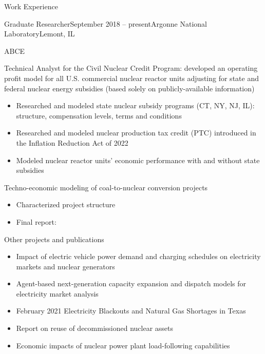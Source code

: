 \documentclass{resume} %
\begin{document}

\begin{rSection}{Work Experience}

\begin{rSubsection}{Graduate Researcher}{September 2018 -- present}{Argonne National Laboratory}{Lemont, IL}
  \setlength{\itemsep}{-5pt}
  \item ABCE

  \item Technical Analyst for the Civil Nuclear Credit Program: developed an operating profit model for all U.S. commercial nuclear reactor units adjusting for state and federal nuclear energy subsidies (based solely on publicly-available information)
  \begin{itemize}
    \item Researched and modeled state nuclear subsidy programs (CT, NY, NJ, IL): structure, compensation levels, terms and conditions
    \item Researched and modeled nuclear production tax credit (PTC) introduced in the Inflation Reduction Act of 2022
    \item Modeled nuclear reactor units' economic performance with and without state subsidies
  \end{itemize}

  \item Techno-economic modeling of coal-to-nuclear conversion projects
  \begin{itemize}
    \item Characterized project structure
    \item Final report:
  \end{itemize}

  \item Other projects and publications
  \begin{itemize}
    \item Impact of electric vehicle power demand and charging schedules on electricity markets and nuclear generators
    \item Agent-based next-generation capacity expansion and dispatch models for electricity market analysis
    \item February 2021 Electricity Blackouts and Natural Gas Shortages in Texas
    \item Report on reuse of decommissioned nuclear assets
    \item Economic impacts of nuclear power plant load-following capabilities
  \end{itemize}


\end{rSubsection}
\end{rSection}
\end{document}
